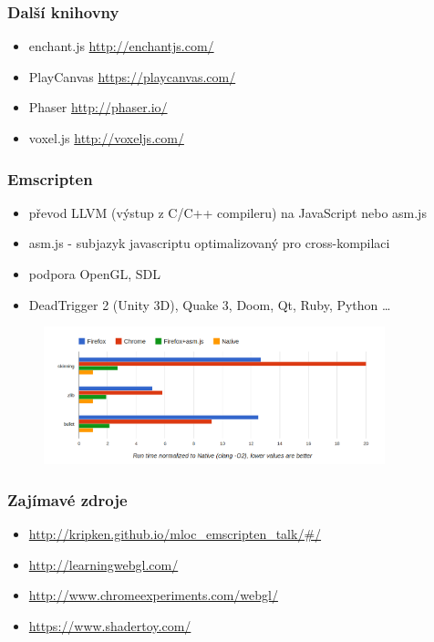 \documentclass{beamer}
\begin{document}
	
	
		\begin{frame}[t,fragile]
		\frametitle{Další knihovny}					
		\begin{itemize}
				\item enchant.js \url{http://enchantjs.com/}
	\item PlayCanvas \url{https://playcanvas.com/}
	\item Phaser \url{http://phaser.io/}
	\item voxel.js \url{http://voxeljs.com/}
		\end{itemize}	

	\end{frame}
	
	
		\begin{frame}[t,fragile]
		\frametitle{Emscripten}					
		\begin{itemize}
			\item převod LLVM (výstup z C/C++ compileru) na JavaScript nebo asm.js
			\item asm.js - subjazyk javascriptu optimalizovaný pro cross-kompilaci
			\item podpora OpenGL, SDL
			\item DeadTrigger 2 (Unity 3D), Quake 3, Doom, Qt, Ruby, Python \dots
		\end{itemize}	
		\begin{figure}		
		\centering
		\includegraphics[height=40mm]{img/micro3b.png}
		\end{figure}

	\end{frame}
	
		
	\begin{frame}[t,fragile]
	
		\frametitle{Zajímavé zdroje}					
		\begin{itemize}
			\item \footnotesize{\url{http://kripken.github.io/mloc_emscripten_talk/#/}}
			\item \url{http://learningwebgl.com/}
			\item \url{http://www.chromeexperiments.com/webgl/}
			\item \url{https://www.shadertoy.com/}
		\end{itemize}			

	\end{frame}
	
	
\end{document}
